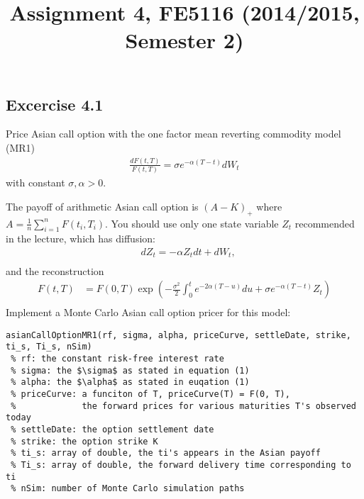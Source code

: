 \documentclass[10pt,a4paper,hidelinks,fleqn]{article}            %
\title{\vspace{-5ex}Assignment 4, FE5116 (2014/2015, Semester 2)\vspace{-7ex}}
\date{}
\begin{document}
\maketitle

\subsection*{Excercise 4.1}
Price Asian call option with the one factor mean reverting commodity model (MR1)
\begin{align}
\frac{dF(t, T)}{F(t, T)} = \sigma e^{-\alpha (T- t)} dW_t
\end{align}
with constant $\sigma, \alpha > 0$.

The payoff of arithmetic Asian call option is $(A - K)_+$ where $A = \frac{1}{n}\sum_{i=1}^n F(t_i, T_i)$. 
You should use only one state variable $Z_t$ recommended in the lecture, which has diffusion:
\begin{align}
& dZ_t = -\alpha Z_t dt + dW_t, \\
\end{align}
and the reconstruction
\begin{align}
F(t, T) & = F(0, T) \exp\left( -\frac{\sigma^2}{2} \int_0^t e^{-2\alpha (T - u)} du + \sigma e^{-\alpha(T-t)} Z_t \right) \\
\end{align}
Implement a Monte Carlo Asian call option pricer for this model:
\vspace{-0.6cm}
\begin{lstlisting}
asianCallOptionMR1(rf, sigma, alpha, priceCurve, settleDate, strike, ti_s, Ti_s, nSim)
 % rf: the constant risk-free interest rate
 % sigma: the $\sigma$ as stated in equation (1) 
 % alpha: the $\alpha$ as stated in euqation (1)
 % priceCurve: a funciton of T, priceCurve(T) = F(0, T), 
 %             the forward prices for various maturities T's observed today 
 % settleDate: the option settlement date
 % strike: the option strike K
 % ti_s: array of double, the ti's appears in the Asian payoff
 % Ti_s: array of double, the forward delivery time corresponding to ti
 % nSim: number of Monte Carlo simulation paths
\end{lstlisting}
\vspace{-0.6cm}
\end{document}
